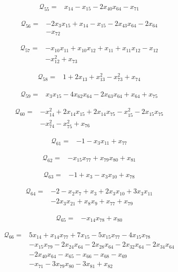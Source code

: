 \begin{align*}
\mathcal{Q}_{55}={}&x_{14}-x_{15}-2x_{40}x_{64}-x_{71}
\end{align*}

\begin{align*}
\mathcal{Q}_{56}={}&-2x_{3}x_{15}+x_{14}-x_{15}-2x_{43}x_{64}-2x_{64}\\
&-x_{72}
\end{align*}

\begin{align*}
\mathcal{Q}_{57}={}&-x_{10}x_{11}+x_{10}x_{12}+x_{11}+x_{11}x_{12}-x_{12}\\
&-x_{12}^{2}+x_{73}
\end{align*}

\begin{align*}
\mathcal{Q}_{58}={}&1+2x_{13}+x_{13}^{2}-x_{73}^{2}+x_{74}
\end{align*}

\begin{align*}
\mathcal{Q}_{59}={}&x_{3}x_{15}-4x_{62}x_{64}-2x_{63}x_{64}+x_{64}+x_{75}
\end{align*}

\begin{align*}
\mathcal{Q}_{60}={}&-x_{14}^{2}+2x_{14}x_{15}+2x_{14}x_{75}-x_{15}^{2}-2x_{15}x_{75}\\
&-x_{74}^{2}-x_{75}^{2}+x_{76}
\end{align*}

\begin{align*}
\mathcal{Q}_{61}={}&-1-x_{3}x_{11}+x_{77}
\end{align*}

\begin{align*}
\mathcal{Q}_{62}={}&-x_{15}x_{77}+x_{79}x_{80}+x_{81}
\end{align*}

\begin{align*}
\mathcal{Q}_{63}={}&-1+x_{3}-x_{3}x_{10}+x_{78}
\end{align*}

\begin{align*}
\mathcal{Q}_{64}={}&-2-x_{2}x_{7}+x_{3}+2x_{3}x_{10}+3x_{3}x_{11}\\
&-2x_{3}x_{21}+x_{8}x_{9}+x_{77}+x_{79}
\end{align*}

\begin{align*}
\mathcal{Q}_{65}={}&-x_{14}x_{78}+x_{80}
\end{align*}

\begin{align*}
\mathcal{Q}_{66}={}&5x_{14}+x_{14}x_{77}+7x_{15}-5x_{15}x_{77}-4x_{15}x_{78}\\
&-x_{15}x_{79}-2x_{24}x_{64}-2x_{28}x_{64}-2x_{32}x_{64}-2x_{34}x_{64}\\
&-2x_{40}x_{64}-x_{65}-x_{66}-x_{68}-x_{69}\\
&-x_{71}-3x_{79}x_{80}-3x_{81}+x_{82}
\end{align*}

